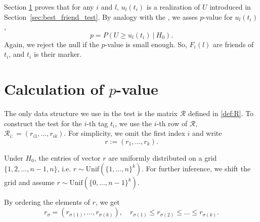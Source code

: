\documentclass{llncs}
\begin{document}

Section \ref{sec:theory} proves that for any $i$ and $l$, $u_l(t_i)$ is a realization of $U$ introduced  in Section~\ref{sec:best_friend_test}.
By analogy with the , we asses $p$-value for $u_{l}(t_i)$,
\[
p = P\left(U \ge u_l(t_i)~|~H_0\right). 
\]
Again, we reject the null if the $p$-value is small enough. So, $F_{i}(l)$ are friends of $t_i$, and $t_i$ is their marker.


\section{Calculation of $p$-value}
\label{sec:theory}

 

The only data structure we use in the test is the matrix $\mathcal{R}$ defined in \eqref{def:R}. To construct the test for the $i$-th tag $t_i$, we use the $i$-th row of $\mathcal{R}$, $\mathcal{R}_{i:} = (r_{i1}, \dots, r_{ik})$. For simplicity, we omit the first index $i$ and write
\[
r := (r_{1}, \dots, r_{k}).
\]

Under $H_0$, the entries of vector $r$ are uniformly distributed on a grid $\{1, 2, \dots, n-1, n\}$, i.e. $r\sim \text{Unif}(\{1, \dots, n\}^k)$. For further inference, we shift the grid and assume $r\sim \text{Unif}(\{0, \dots, n-1\}^k)$.

By ordering the elements of $r$, we get
\[
r_{\sigma} = (r_{\sigma(1)}, \dots, r_{\sigma(k)}), 
\quad
r_{\sigma(1)} \leq r_{\sigma(2)} \leq \dots \leq r_{\sigma(k)}.
\]
\end{document}
